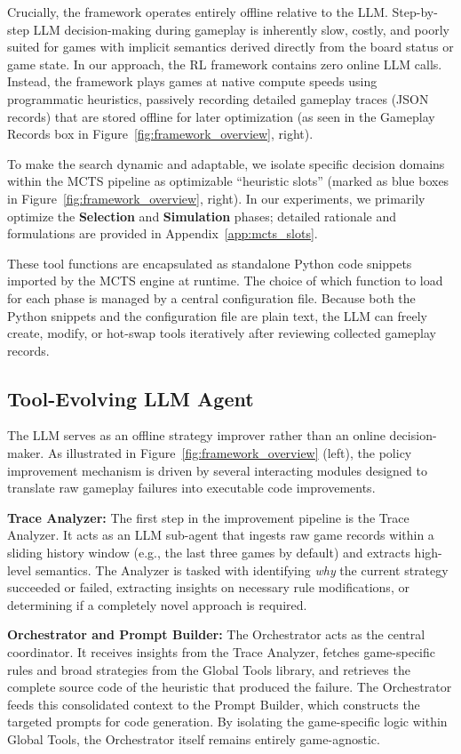 \documentclass{article}
\begin{document}
Crucially, the framework operates entirely offline relative to the LLM. Step-by-step LLM decision-making during gameplay is inherently slow, costly, and poorly suited for games with implicit semantics derived directly from the board status or game state. In our approach, the RL framework contains zero online LLM calls. Instead, the framework plays games at native compute speeds using programmatic heuristics, passively recording detailed gameplay traces (JSON records) that are stored offline for later optimization (as seen in the Gameplay Records box in Figure~\ref{fig:framework_overview}, right).

To make the search dynamic and adaptable, we isolate specific decision domains within the MCTS pipeline as optimizable ``heuristic slots'' (marked as blue boxes in Figure~\ref{fig:framework_overview}, right). In our experiments, we primarily optimize the \textbf{Selection} and \textbf{Simulation} phases; detailed rationale and formulations are provided in Appendix~\ref{app:mcts_slots}.

These tool functions are encapsulated as standalone Python code snippets imported by the MCTS engine at runtime. The choice of which function to load for each phase is managed by a central configuration file. Because both the Python snippets and the configuration file are plain text, the LLM can freely create, modify, or hot-swap tools iteratively after reviewing collected gameplay records.

\subsection{Tool-Evolving LLM Agent}
\label{sec:method_llm}
The LLM serves as an offline strategy improver rather than an online decision-maker. As illustrated in Figure~\ref{fig:framework_overview} (left), the policy improvement mechanism is driven by several interacting modules designed to translate raw gameplay failures into executable code improvements.

\textbf{Trace Analyzer:} The first step in the improvement pipeline is the Trace Analyzer. It acts as an LLM sub-agent that ingests raw game records within a sliding history window (e.g., the last three games by default) and extracts high-level semantics. The Analyzer is tasked with identifying \textit{why} the current strategy succeeded or failed, extracting insights on necessary rule modifications, or determining if a completely novel approach is required.

\textbf{Orchestrator and Prompt Builder:} The Orchestrator acts as the central coordinator. It receives insights from the Trace Analyzer, fetches game-specific rules and broad strategies from the Global Tools library, and retrieves the complete source code of the heuristic that produced the failure. The Orchestrator feeds this consolidated context to the Prompt Builder, which constructs the targeted prompts for code generation. By isolating the game-specific logic within Global Tools, the Orchestrator itself remains entirely game-agnostic.
\end{document}
